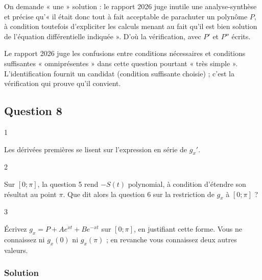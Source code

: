 \documentclass[11pt,a4paper]{article}
\begin{document}
\begin{jury}

On demande « une » solution : le rapport 2026 juge inutile une analyse-synthèse et précise qu'« il était donc tout à fait acceptable de parachuter un polynôme \(P\), à condition toutefois d'expliciter les calculs menant au fait qu'il est bien solution de l'équation différentielle indiquée ». D'où la vérification, avec \(P'\) et \(P''\) écrits.

\end{jury}

\begin{piege}

Le rapport 2026 juge les confusions entre conditions nécessaires et conditions suffisantes « omniprésentes » dans cette question pourtant « très simple ». L'identification fournit un candidat (condition suffisante choisie) ; c'est la vérification qui prouve qu'il convient.

\end{piege}

\hypertarget{question-8}{%
\subsection{Question 8}\label{question-8}}

\begin{indication}{1}

Les dérivées premières se lisent sur l'expression en série de \(g_x'\).

\end{indication}

\begin{indication}{2}

Sur \([0;\pi]\), la question 5 rend \(-S(t)\) polynomial, à condition d'étendre son résultat au point \(\pi\). Que dit alors la question 6 sur la restriction de \(g_x\) à \([0;\pi]\) ?

\end{indication}

\begin{indication}{3}

Écrivez \(g_x=P+Ae^{xt}+Be^{-xt}\) sur \([0;\pi]\), en justifiant cette forme. Vous ne connaissez ni \(g_x(0)\) ni \(g_x(\pi)\) ; en revanche vous connaissez deux autres valeurs.

\end{indication}

\hypertarget{solution-7}{%
\subsubsection{Solution}\label{solution-7}}
\end{document}
